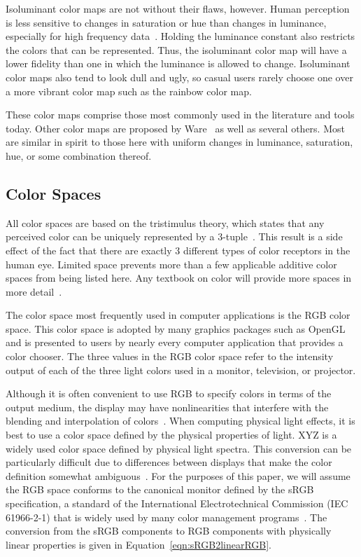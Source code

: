 \documentclass[review,journal]{vgtc}         %
\newcommand{\lcite}[1]{~\cite{#1}}
\newcommand{\scite}[1]{~\cite{#1}}
\newcommand{\RGB}{RGB\xspace}
\newcommand{\XYZ}{XYZ\xspace}
\begin{document}
Isoluminant color maps are not without their flaws, however.  Human
perception is less sensitive to changes in saturation or hue than changes
in luminance, especially for high frequency data\lcite{Rogowitz96}.
Holding the luminance constant also restricts the colors that can be
represented.  Thus, the isoluminant color map will have a lower fidelity
than one in which the luminance is allowed to change.  Isoluminant color
maps also tend to look dull and ugly, so casual users rarely
choose one over a more vibrant color map such as the rainbow color map.

These color maps comprise those most commonly used in the literature and tools
today.  Other color maps are proposed by Ware\scite{Ware04} as well as
several others.  Most are similar in spirit to those here with uniform
changes in luminance, saturation, hue, or some combination thereof.

\subsection{Color Spaces}
\label{sec:PreviousWork:ColorSpaces}

All color spaces are based on the tristimulus theory, which states that any
perceived color can be uniquely represented by a
3-tuple\lcite{Stone03}.  This result is a side effect
of the fact that there are exactly 3 different types of color receptors in
the human eye.  Limited space prevents more than a few applicable additive
color spaces from being listed here.  Any textbook on color will provide
more spaces in more detail\lcite{Stone03,Wyszecki82}.

The color space most frequently used in computer applications is the \RGB
color space.  This color space is adopted by many graphics packages such as
OpenGL and is presented to users by nearly every computer application
that provides a color chooser.  The three values in the \RGB
color space refer to the intensity output of each of the three light colors
used in a monitor, television, or projector.

Although it is often convenient to use \RGB to specify colors in terms of
the output medium, the display may have nonlinearities that interfere with
the blending and interpolation of colors\lcite{Stone03}.  When computing
physical light effects, it is best to use a color space defined by the
physical properties of light.  \XYZ is a widely used color space defined by
physical light spectra.  This conversion can be particularly difficult due
to differences between displays that make the color definition somewhat
ambiguous\lcite{Fortner97}.  For the purposes of this paper, we will assume
the \RGB space conforms to the canonical monitor defined by the sRGB
specification, a standard of the International Electrotechnical Commission
(IEC 61966-2-1) that is widely used by many color management
programs\lcite{Stone03}.  The conversion from the sRGB components to \RGB
components with physically linear properties is given in Equation~\ref{eqn:sRGB2linearRGB}.
\end{document}
